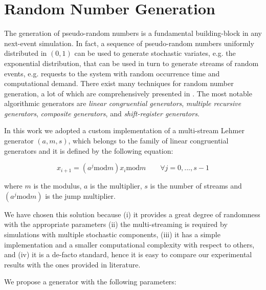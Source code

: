 \section{Random Number Generation}
\label{sec:random-number-generation}

The generation of pseudo-random numbers is a fundamental building-block in any next-event simulation.
%
In fact, a sequence of pseudo-random numbers uniformly distributed in $(0,1)$ can be used to generate stochastic variates, e.g. the exponential distribution, that can be used in turn to generate streams of random events, e.g. requests to the system with random occurrence time and computational demand.
%
There exist many techniques for random number generation, a lot of which are comprehensively presented in \cite{l1994uniform}.
The most notable algorithmic generators are \textit{linear congruential generators}, \textit{multiple recursive generators}, \textit{composite generators}, and \textit{shift-register generators}.

In this work we adopted a custom implementation of a multi-stream Lehmer generator $(a,m,s)$, which belongs to the family of linear congruential generators and it is defined by the following equation:

\begin{equation}
\label{eqn:lehmer}
x_{i+1} = (a^{j} \mathrm{mod}m) x_{i} \mathrm{mod}m \qquad\forall j=0,...,s-1
\end{equation}

where $m$ is the modulus, $a$ is the multiplier, $s$ is the number of streams and $(a^{j} \mathrm{mod}m)$ is the jump multiplier.

We have chosen this solution because 
(i) it provides a great degree of randomness with the appropriate parameters 
(ii) the multi-streaming is required by simulations with multiple stochastic components,
(iii) it has a simple implementation and a smaller computational complexity with respect to others, and 
(iv) it is a de-facto standard, hence it is easy to compare our experimental results with the ones provided in literature.

We propose a generator with the following parameters:

